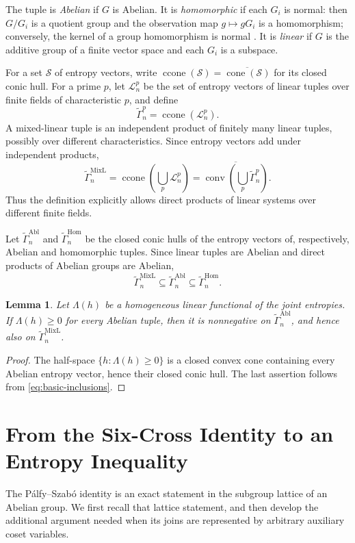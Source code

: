 \documentclass[journal]{IEEEtran}
\newtheorem{lemma}[theorem]{Lemma}
\newcommand{\MixL}{\widetilde\Gamma^{\mathrm{MixL}}}
\newcommand{\Abl}{\widetilde\Gamma^{\mathrm{Abl}}}
\newcommand{\Hom}{\widetilde\Gamma^{\mathrm{Hom}}}
\newcommand{\conv}{\operatorname{conv}}
\begin{document}
The tuple is \emph{Abelian} if $G$ is Abelian.  It is \emph{homomorphic} if
each $G_i$ is normal: then $G/G_i$ is a quotient group and the observation map
$g\mapsto gG_i$ is a homomorphism; conversely, the kernel of a group
homomorphism is normal \cite{KaboliKhazaeiParviz2021}.  It is \emph{linear} if
$G$ is the additive group of a finite vector space and each $G_i$ is a
subspace.

For a set $\mathcal S$ of entropy vectors, write
$\operatorname{ccone}(\mathcal S)=\overline{\operatorname{cone}(\mathcal S)}$
for its closed conic hull.  For a prime $p$, let $\mathcal L_n^p$ be the set of
entropy vectors of linear tuples over finite fields of characteristic $p$, and
define
\[
  \widetilde\Gamma_n^p=\operatorname{ccone}(\mathcal L_n^p).
\]
A mixed-linear tuple is an independent product of finitely many linear tuples,
possibly over different characteristics.  Since entropy vectors add under
independent products,
\begin{equation}\label{eq:mixl-precise}
 \MixL_n
 =\operatorname{ccone}\!\left(\bigcup_p\mathcal L_n^p\right)
 =\overline{\conv\!\left(\bigcup_p\widetilde\Gamma_n^p\right)}.
\end{equation}
Thus the definition explicitly allows direct products of linear systems over
different finite fields.

Let $\Abl_n$ and $\Hom_n$ be the closed conic hulls of the entropy vectors of,
respectively, Abelian and homomorphic tuples.  Since linear tuples are Abelian
and direct products of Abelian groups are Abelian,
\begin{equation}\label{eq:basic-inclusions}
  \MixL_n\subseteq\Abl_n\subseteq\Hom_n.
\end{equation}

\begin{lemma}\label{lem:closure}
Let $\Lambda(h)$ be a homogeneous linear functional of the joint entropies.  If
$\Lambda(h)\ge0$ for every Abelian tuple, then it is nonnegative on $\Abl_n$,
and hence also on $\MixL_n$.
\end{lemma}
\begin{proof}
The half-space $\{h:\Lambda(h)\ge0\}$ is a closed convex cone containing every
Abelian entropy vector, hence their closed conic hull.  The last assertion
follows from \eqref{eq:basic-inclusions}.
\end{proof}

\section{From the Six-Cross Identity to an Entropy Inequality}\label{sec:lift}
The P\'alfy--Szab\'o identity
\cite{PalfySzabo1995Congruence,PalfySzabo1995,Penttila2017} is an exact
statement in the subgroup lattice of an Abelian group.  We first recall that lattice statement, and then develop the
additional argument needed when its joins are represented by arbitrary
auxiliary coset variables.
\end{document}
